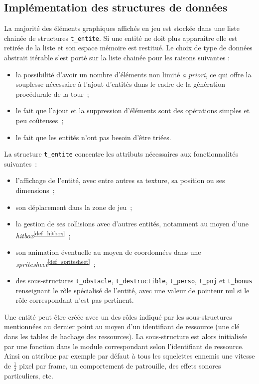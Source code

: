 \documentclass[a4paper,12pt]{article}
\newcommand\refsuscrite[1]{\textsuperscript{\ref{#1}}}
\begin{document}
\subsection{Implémentation des structures de données}

La majorité des éléments graphiques affichés en jeu est stockée dans une liste chainée de structures \texttt{t\_entite}.
Si une entité ne doit plus apparaitre elle est retirée de la liste et son espace mémoire est restitué.
Le choix de type de données abstrait itérable s’est porté sur la liste chainée pour les raisons suivantes :
\begin{itemize}
    \item la possibilité d’avoir un nombre d’éléments non limité \textit{a priori}, ce qui offre la souplesse nécessaire à l’ajout d’entités dans le cadre de la génération procédurale de la tour ;
    \item le fait que l’ajout et la suppression d’éléments sont des opérations simples et peu coûteuses ;
    \item le fait que les entités n’ont pas besoin d’être triées.
\end{itemize}

La structure \texttt{t\_entite} concentre les attributs nécessaires aux fonctionnalités suivantes :
\begin{itemize}
	\item l’affichage de l’entité, avec entre autres sa texture, sa position ou ses dimensions ;
	\item son déplacement dans la zone de jeu ;
	\item la gestion de ses collisions avec d’autres entités, notamment au moyen d’une \textit{hitbox}\refsuscrite{def_hitbox} ;
	\item son animation éventuelle au moyen de coordonnées dans une \textit{spritesheet}\refsuscrite{def_spritesheet} ;
	\item des sous-structures \texttt{t\_obstacle}, \texttt{t\_destructible}, \texttt{t\_perso}, \texttt{t\_pnj} et \texttt{t\_bonus} renseignant le rôle spécialisé de l’entité, avec une valeur de pointeur nul si le rôle correspondant n’est pas pertinent.
\end{itemize}
Une entité peut être créée avec un des rôles indiqué par les sous-structures mentionnées au dernier point au moyen d’un identifiant de ressource (une clé dans les tables de hachage des ressources). La sous-structure est alors initialisée par une fonction dans le module correspondant selon l’identifiant de ressource. Ainsi on attribue par exemple par défaut à tous les squelettes ennemis une vitesse de $\frac12$ pixel par frame, un comportement de patrouille, des effets sonores particuliers, etc.
\end{document}
